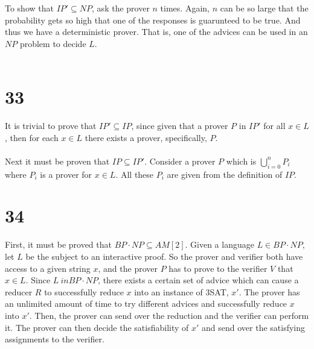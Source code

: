 \documentclass[letterpaper,notitlepage,twoside]{article}
\begin{document}
To show that $IP' \subseteq NP$, ask the prover $n$ times. Again, $n$ can be so large that the probability gets so high that one of the responses is guarunteed to be true. And thus we have a deterministic prover. That is, one of the advices can be used in an $NP$ problem to decide $L$. \\\\

\section*{33}
It is trivial to prove that $IP' \subseteq IP$, since given that a prover $P$ in $IP'$ for all $x \in L$, then for each $x \in L$ there exists a prover, specifically, $P$. \\\\

Next it must be proven that $IP \subseteq IP'$. Consider a prover $P$ which is $\bigcup_{i = 0}^n P_i$ where $P_i$ is a prover for $x \in L$. All these $P_i$ are given from the definition of $IP$. 

\section*{34}
First, it must be proved that $BP \cdot NP \subseteq AM\left[2\right]$. Given a language $L \in BP \cdot NP$, let $L$ be the subject to an interactive proof. So the prover and verifier both have access to a given string $x$, and the prover $P$ has to prove to the verifier $V$ that $x \in L$. Since $L \ in BP \cdot NP$, there exists a certain set of advice which can cause a reducer $R$ to successfully reduce $x$ into an instance of 3SAT, $x'$. The prover has an unlimited amount of time to try different advices and successfully reduce $x$ into $x'$. Then, the prover can send over the reduction and the verifier can perform it. The prover can then decide the satisfiability of $x'$ and send over the satisfying assignments to the verifier.
\end{document}
